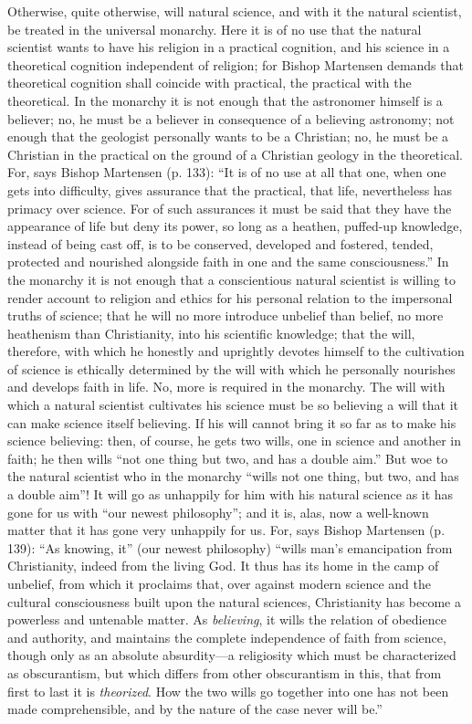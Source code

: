 \documentclass[12pt]{book}
\newcommand{\opage}[1]{\marginnote{\footnotesize\textit{[#1]}}}
\begin{document}
Otherwise, quite otherwise, will natural science, and with it the natural scientist, be treated in the universal monarchy. Here it is of no use that the natural scientist wants to have his religion in a practical cognition, and his science in a theoretical cognition independent of religion; for Bishop Martensen demands that theoretical
\opage{37}\setcounter{footnote}{0}%
cognition shall coincide with practical, the practical with the theoretical. In the monarchy it is not enough that the astronomer himself is a believer; no, he must be a believer in consequence of a believing astronomy; not enough that the geologist personally wants to be a Christian; no, he must be a Christian in the practical on the ground of a Christian geology in the theoretical. For, says Bishop Martensen (p. 133): ``It is of no use at all that one, when one gets into difficulty, gives assurance that the practical, that life, nevertheless has primacy over science. For of such assurances it must be said that they have the appearance of life but deny its power, so long as a heathen, puffed-up knowledge, instead of being cast off, is to be conserved, developed and fostered, tended, protected and nourished alongside faith in one and the same consciousness.'' In the monarchy it is not enough that a conscientious natural scientist is willing to render account to religion and ethics for his personal relation to the impersonal truths of science; that he will no more introduce unbelief than belief, no more heathenism than Christianity, into his scientific knowledge; that the will, therefore, with which he honestly and uprightly devotes himself to the cultivation of science is ethically determined by the will with which he personally nourishes and develops faith in life. No, more is required in the monarchy. The will with which a natural scientist cultivates his science must be so believing a will that it can make science itself believing. If his will cannot bring it so far as to make his science believing: then, of course, he gets two wills, one in science and another in faith; he then wills ``not one thing but two, and has a double aim.'' But woe to the natural scientist who in the monarchy ``wills not one thing, but two, and has a double aim''! It will go as unhappily for him with his natural science as it has gone for us with ``our newest philosophy''; and it is, alas, now a well-known matter that it has gone very unhappily for us. For, says Bishop Martensen (p. 139): ``As
\opage{38}\setcounter{footnote}{0}%
knowing, it'' (our newest philosophy) ``wills man's emancipation from Christianity, indeed from the living God. It thus has its home in the camp of unbelief, from which it proclaims that, over against modern science and the cultural consciousness built upon the natural sciences, Christianity has become a powerless and untenable matter. As \emph{believing}, it wills the relation of obedience and authority, and maintains the complete independence of faith from science, though only as an absolute absurdity---a religiosity which must be characterized as obscurantism, but which differs from other obscurantism in this, that from first to last it is \emph{theorized}. How the two wills go together into one has not been made comprehensible, and by the nature of the case never will be.''
\end{document}
